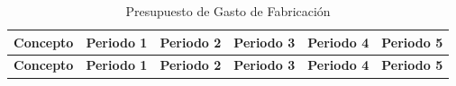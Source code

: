 \documentclass[
  stu,
  floatsintext,
  longtable,
  a4paper,
  nolmodern,
  notxfonts,
  notimes,
  12pt,
  colorlinks=true,linkcolor=blue,citecolor=blue,urlcolor=blue]{apa7}
\begin{document}
\begin{longtable}[]{@{}
  >{\raggedright\arraybackslash}p{}
  >{\centering\arraybackslash}p{}
  >{\centering\arraybackslash}p{}
  >{\centering\arraybackslash}p{}
  >{\centering\arraybackslash}p{}
  >{\centering\arraybackslash}p{}@{}}
\caption{Presupuesto de Gasto de Fabricación}\tabularnewline
\toprule\noalign{}
\begin{minipage}[b]{\linewidth}\raggedright
\textbf{Concepto}
\end{minipage} & \begin{minipage}[b]{\linewidth}\centering
\textbf{Periodo 1}
\end{minipage} & \begin{minipage}[b]{\linewidth}\centering
\textbf{Periodo 2}
\end{minipage} & \begin{minipage}[b]{\linewidth}\centering
\textbf{Periodo 3}
\end{minipage} & \begin{minipage}[b]{\linewidth}\centering
\textbf{Periodo 4}
\end{minipage} & \begin{minipage}[b]{\linewidth}\centering
\textbf{Periodo 5}
\end{minipage} \\
\midrule\noalign{}
\endfirsthead
\toprule\noalign{}
\begin{minipage}[b]{\linewidth}\raggedright
\textbf{Concepto}
\end{minipage} & \begin{minipage}[b]{\linewidth}\centering
\textbf{Periodo 1}
\end{minipage} & \begin{minipage}[b]{\linewidth}\centering
\textbf{Periodo 2}
\end{minipage} & \begin{minipage}[b]{\linewidth}\centering
\textbf{Periodo 3}
\end{minipage} & \begin{minipage}[b]{\linewidth}\centering
\textbf{Periodo 4}
\end{minipage} & \begin{minipage}[b]{\linewidth}\centering
\textbf{Periodo 5}
\end{minipage} \\

\end{longtable}
\end{document}

